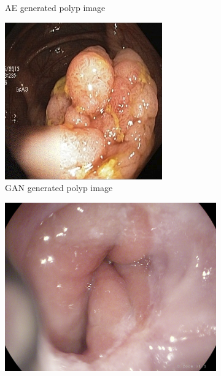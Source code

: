 \begin{figure}
\begin{subfigure}[t]{\myfigsizethree}
            \caption{AE generated polyp image }   
            \label{fig:polyp_AE_SQUARE1}
        \end{subfigure}
        \qquad
        \begin{subfigure}[t]{\myfigsizethree}  
            \centering 
            \includegraphics[width=\textwidth]{experiments/figures/greensquare/polypGAN.png}
            \caption{GAN generated polyp image}   
            \label{fig:polyp_GAN_SQUARE1}
        \end{subfigure}
        \qquad\vfill%
        \begin{subfigure}[t]{\myfigsizethree}   
            \centering 
            \includegraphics[height=\textwidth ,width=\textwidth]{experiments/figures/greensquare/zORIG.png}

\end{subfigure}
\end{figure}

